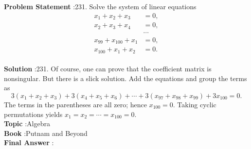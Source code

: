 \documentclass[10pt]{article}
\begin{document}
\textbf{Problem Statement} :231. Solve the system of linear equations$$ \begin{aligned} x_{1}+x_{2}+x_{3} &=0, \\ x_{2}+x_{3}+x_{4} &=0, \\ & \cdots \\ x_{99}+x_{100}+x_{1} &=0, \\ x_{100}+x_{1}+x_{2} &=0 . \end{aligned} $$\\
\textbf{Solution} :231. Of course, one can prove that the coefficient matrix is nonsingular. But there is a slick solution. Add the equations and group the terms as $$ 3\left(x_{1}+x_{2}+x_{3}\right)+3\left(x_{4}+x_{5}+x_{6}\right)+\cdots+3\left(x_{97}+x_{98}+x_{99}\right)+3 x_{100}=0 . $$The terms in the parentheses are all zero; hence $x_{100}=0$. Taking cyclic permutations yields $x_{1}=x_{2}=\cdots=x_{100}=0$.\\
\textbf{Topic} :Algebra\\
\textbf{Book} :Putnam and Beyond\\
\textbf{Final Answer} :\\
\end{document}
